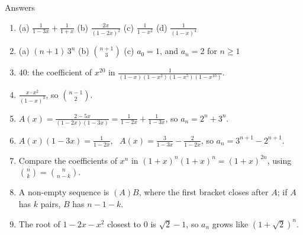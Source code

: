 \documentclass[10pt]{wosm-slides}
\begin{document}
\begin{frame}{Answers}
  \small
  \begin{enumerate}
    \item (a) $\frac{1}{1-3x} + \frac{1}{1+x}$ \quad (b) $\frac{2x}{(1-2x)^2}$ \quad
      (c) $\frac{1}{1-x^2}$ \quad (d) $\frac{1}{(1-x)^4}$
    \item (a) $(n+1)\,3^n$ \quad (b) $\binom{n+1}{3}$ \quad (c) $a_0 = 1$, and $a_n = 2$ for $n \ge 1$
    \item $40$: the coefficient of $x^{20}$ in
      $\frac{1}{(1-x)(1-x^2)(1-x^5)(1-x^{10})}$.
    \item $\frac{x \cdot x^2}{(1-x)^3}$, so $\binom{n-1}{2}$.
    \item $A(x) = \frac{2 - 5x}{(1-2x)(1-3x)} = \frac{1}{1-2x} + \frac{1}{1-3x}$, so
      $a_n = 2^n + 3^n$.
    \item $A(x)(1 - 3x) = \frac{1}{1-2x}$, \ $A(x) = \frac{3}{1-3x} - \frac{2}{1-2x}$, so
      $a_n = 3^{n+1} - 2^{n+1}$.
    \item Compare the coefficients of $x^n$ in $(1+x)^n (1+x)^n = (1+x)^{2n}$, using
      $\binom{n}{k} = \binom{n}{n-k}$.
    \item A non-empty sequence is $(A)B$, where the first bracket closes after $A$; if $A$ has
      $k$ pairs, $B$ has $n - 1 - k$.
    \item The root of $1 - 2x - x^2$ closest to $0$ is $\sqrt2 - 1$, so $a_n$ grows like
      $(1 + \sqrt2)^n$.
  \end{enumerate}
\end{frame}

\end{document}
